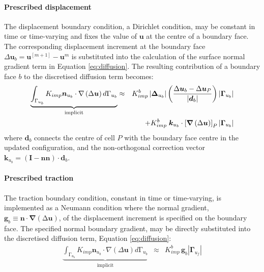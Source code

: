 \documentclass[sn-mathphys,Numbered]{sn-jnl}%
\newcommand{\bb}{\boldsymbol}
\begin{document}
\paragraph{Prescribed displacement}
The displacement boundary condition, a Dirichlet condition, may be constant in time or time-varying and fixes the value of $\bb{u}$ at the centre of a boundary face.
The corresponding displacement increment at the boundary face $\Delta \bb{u}_b = \bb{u}^{[m+1]} - \bb{u}^{m}$ is substituted into the calculation of the surface normal gradient term in Equation \ref{eq:diffusion}.
The resulting contribution of a boundary face $b$ to the discretised diffusion term becomes:
\begin{eqnarray} \label{eq:diffusionBC}
	\underbrace{ \int_{\mathrm{\Gamma}_{u_b}}
	 K_{imp} \bb{n}_{u_b} \cdot\nabla\left(\Delta\bb{u}\right) d\mathrm{\Gamma}_{u_b} }_{\text {implicit}}
	&\approx&
	K_{imp}^b \left|\boldsymbol{\Delta}_{u_b}\right|\left(\frac{\Delta \bb{u}_{b} - \Delta \bb{u}_P}{\left|\bb{d}_b\right|}\right)\left|\bb{\Gamma}_{u_b}\right| \notag \\
	    &&+ K_{imp}^b \; \bb{k}_{u_b} \cdot
	    \left[
	    \boldsymbol{\nabla} \left(\mathrm{\Delta}\bb{u}\right)
	    \right]_P
	    \left|\bb{\Gamma}_{u_b}\right|
\end{eqnarray}
where $\bb{d}_b$ connects the centre of cell $P$ with the boundary face centre in the updated configuration, and the non-orthogonal correction vector $\bb{k}_{u_b} = (\textbf{I} - \bb{n}\bb{n}) \cdot \bb{d}_b$.



\paragraph{Prescribed traction}
The traction boundary condition, constant in time or time-varying, is implemented as a Neumann condition where the normal gradient, $\bb{g}_b \equiv \bb{n} \cdot \boldsymbol{\nabla} \left(\mathrm{\Delta}\bb{u}\right)$, of the displacement increment is specified on the boundary face.
The specified normal boundary gradient, may be directly substituted into the discretised diffusion term, Equation \ref{eq:diffusion}:
\begin{eqnarray}
	\underbrace{ \int_{\mathrm{\Gamma}_{u_b}}
	K_{imp} \bb{n}_{u_b} \cdot\nabla \left(\Delta\bb{u}\right) d\mathrm{\Gamma}_{u_b} }_{\text {implicit}}
	&\approx&
	K_{imp}^b \, \bb{g}_b \left|\bb{\Gamma}_{u_f}\right|
\end{eqnarray}
\end{document}
